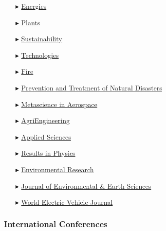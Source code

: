 \begin{itemize}
    \item[$\blacktriangleright$] \href{https://www.mdpi.com/journal/energies/}{Energies}

    \item[$\blacktriangleright$] \href{https://www.mdpi.com/journal/plants/}{Plants}

    \item[$\blacktriangleright$] \href{https://www.mdpi.com/journal/sustainability/}{Sustainability}

    \item[$\blacktriangleright$] \href{https://www.mdpi.com/journal/technologies/}{Technologies}

    \item[$\blacktriangleright$] \href{https://www.mdpi.com/journal/fire/}{Fire}

    \item[$\blacktriangleright$] \href{https://ojs.ukscip.com/index.php/ptnd/}{Prevention and Treatment of Natural Disasters}

    \item[$\blacktriangleright$] \href{https://www.aimspress.com/journal/mina/}{Metascience in Aerospace}

    \item[$\blacktriangleright$] \href{https://www.mdpi.com/journal/agriengineering/}{AgriEngineering}

    \item[$\blacktriangleright$] \href{https://www.mdpi.com/journal/applsci/}{Applied Sciences}

    \item[$\blacktriangleright$] \href{https://www.sciencedirect.com/journal/results-in-physics/}{Results in Physics}

    \item[$\blacktriangleright$] \href{https://www.sciencedirect.com/journal/environmental-research/ }{Environmental Research}
    
    \item[$\blacktriangleright$] \href{https://journals.bilpubgroup.com/index.php/jees/}{Journal of Environmental \& Earth Sciences}

    \item[$\blacktriangleright$] \href{https://www.mdpi.com/journal/wevj/}{World Electric Vehicle Journal}
    
\end{itemize}

\separator
\subsubsection{International Conferences}

